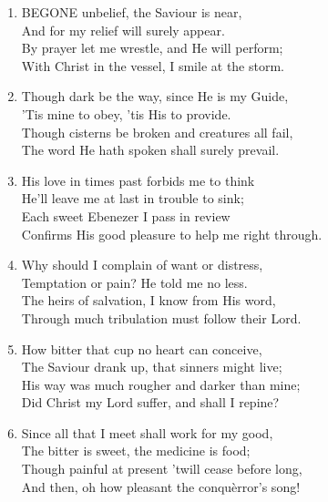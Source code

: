 \begin{enumerate}
    \item BEGONE unbelief, the Saviour is near, \\
        And for my relief will surely appear. \\
        By prayer let me wrestle, and He will perform; \\
        With Christ in the vessel, I smile at the storm.

    \item Though dark be the way, since He is my Guide, \\
        'Tis mine to obey, 'tis His to provide. \\
        Though cisterns be broken and creatures all fail, \\
        The word He hath spoken shall surely prevail.

    \item His love in times past forbids me to think \\
        He'll leave me at last in trouble to sink; \\
        Each sweet Ebenezer I pass in review \\
        Confirms His good pleasure to help me right through.

    \item Why should I complain of want or distress, \\
        Temptation or pain? He told me no less. \\
        The heirs of salvation, I know from His word, \\
        Through much tribulation must follow their Lord.

    \item How bitter that cup no heart can conceive, \\
        The Saviour drank up, that sinners might live; \\
        His way was much rougher and darker than mine; \\
        Did Christ my Lord suffer, and shall I repine?

    \item Since all that I meet shall work for my good, \\
        The bitter is sweet, the medicine is food; \\
        Though painful at present 'twill cease before long, \\
        And then, oh how pleasant the conqu\`error's song!

\end{enumerate}

